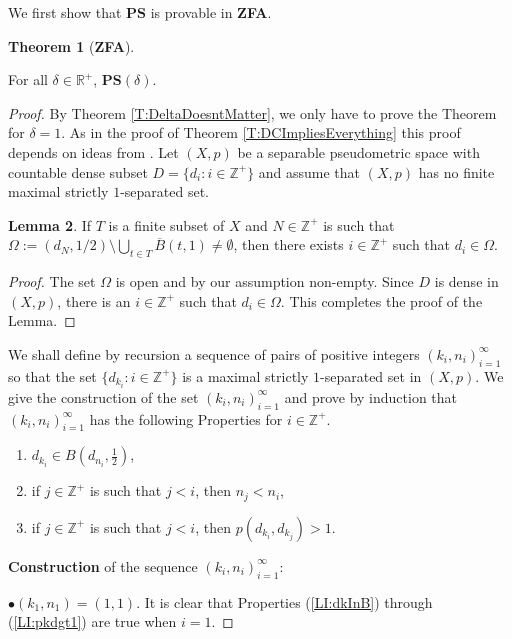 \documentclass[11pt, reqno]{amsart}
\theoremstyle{definition}
\newtheorem{theorem}{Theorem}
\numberwithin{theorem}{section}
\theoremstyle{definition}
\theoremstyle{definition}
\newtheorem{lemma}[theorem]{Lemma}
\theoremstyle{definition}
\theoremstyle{definition}
\theoremstyle{definition}
\numberwithin{claim}{section}
\theoremstyle{definition}
\theoremstyle{definition}
\theoremstyle{definition}
\theoremstyle{definition}
\theoremstyle{definition}
\newcommand{\PS}{\mathbf{PS}(\delta)}
\theoremstyle{remboldstyle}
\begin{document}
We first show that $\textbf{PS}$ is provable in \textbf{ZFA}.
\begin{theorem}[\textbf{ZFA}]
\label{T:ZFtoPS}

For all $\delta \in \mathbb{R}^+$, $\PS$.
\end{theorem}
\begin{proof}
By Theorem \ref{T:DeltaDoesntMatter}, we only have to prove the Theorem for $\delta = 1$. As in the proof of Theorem \ref{T:DCImpliesEverything} this proof depends on ideas from \cite{Dyb-Gorka1}.  Let $(X,p)$ be a separable pseudometric space with countable dense subset $D = \{d_i : i \in \mathbb{Z}^{+} \}$ and assume that $(X,p)$ has no finite maximal strictly $1$-separated set.  

\begin{lemma} \label{L:ForDefOfkini}
If $T$ is a finite subset of $X$ and $N \in \mathbb{Z}^{+}$ is such that $\Omega := (d_N, 1/2) \setminus \bigcup_{t\in T}\overline{B}(t,1) \neq \emptyset$, then there exists $i \in \mathbb{Z}^{+}$ such that $d_i \in \Omega$.
\end{lemma}
\begin{proof}
The set $\Omega$ is open and by our assumption non-empty. Since $D$ is dense in $(X,p)$, there is an $i \in \mathbb{Z}^{+}$ such that $d_i \in \Omega$.
This completes the proof of the Lemma.
\end{proof}
We shall define by recursion a sequence of pairs of positive integers $(k_i, n_i)_{i=1}^\infty$ so that the set $\{ d_{k_i} : i \in \mathbb{Z}^+ \}$ is a maximal strictly $1$-separated set in $(X,p)$. We give the construction of the set $(k_i, n_i)_{i=1}^\infty$ and prove by induction that $(k_i, n_i)_{i=1}^\infty$ has the following Properties for $i \in \mathbb{Z}^+$.
\begin{enumerate}
\item \label{LI:dkInB} $d_{k_i} \in B(d_{n_i}, \frac{1}{2})$,
\item \label{LI:OrdPre} if $j \in \mathbb{Z}^+$ is such that $j < i$, then $n_j < n_i$,
\item \label{LI:pkdgt1} if $j \in \mathbb{Z}^+$ is such that $j < i$, then $p(d_{k_i}, d_{k_j}) > 1$.
\end{enumerate}
{\bf Construction}  of the sequence $(k_i, n_i)_{i=1}^\infty$:

 $\bullet (k_1,n_1) = (1,1)$.
It is clear that Properties (\ref{LI:dkInB}) through (\ref{LI:pkdgt1}) are true when $i = 1$.


\end{proof}
\end{document}
